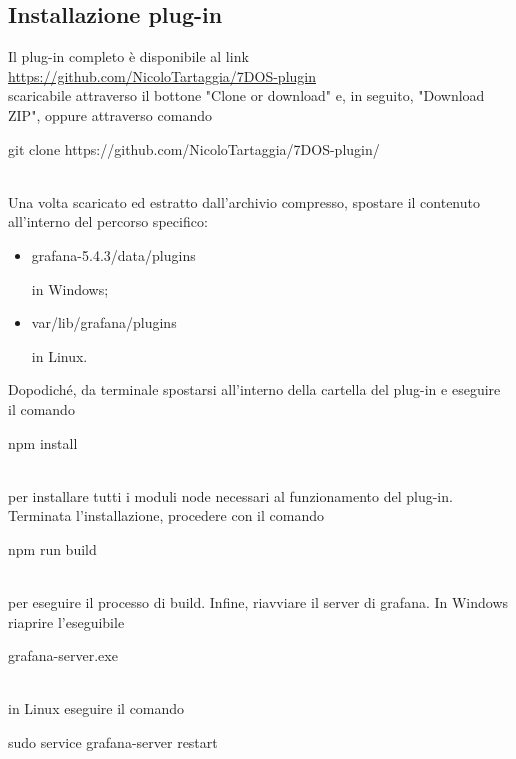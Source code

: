 \subsection{Installazione plug-in}
Il plug-in completo è disponibile al link \\[0.2cm]
\hspace*{10mm}\url{https://github.com/NicoloTartaggia/7DOS-plugin}\\[0.2cm]scaricabile attraverso il bottone "Clone or download" e, in seguito, "Download ZIP", oppure attraverso comando \\[0.2cm]
\hspace*{10mm}\begin{ttfamily}git clone https://github.com/NicoloTartaggia/7DOS-plugin/\end{ttfamily}\\[0.2cm]Una volta scaricato ed estratto dall'archivio compresso, spostare il contenuto all'interno del percorso specifico: 
\begin{itemize}
	\item{\begin{ttfamily}grafana-5.4.3/data/plugins\end{ttfamily}} in Windows; \item{\begin{ttfamily}var/lib/grafana/plugins\end{ttfamily} in Linux.}
\end{itemize}
Dopodiché, da terminale spostarsi all'interno della cartella del plug-in e eseguire il comando \\[0.2cm]
\hspace*{10mm}\begin{ttfamily}npm install\end{ttfamily}\\[0.2cm] per installare tutti i moduli node necessari al funzionamento del plug-in. Terminata l'installazione, procedere con il comando \\[0.2cm]
\hspace*{10mm}\begin{ttfamily}npm run build\end{ttfamily}\\[0.2cm] per eseguire il processo di build. 
Infine, riavviare il server di grafana. In Windows riaprire l'eseguibile \\[0.2cm]
\hspace*{10mm}\begin{ttfamily}grafana-server.exe\end{ttfamily}\\[0.2cm] in Linux eseguire il comando \\[0.2cm]
\hspace*{10mm}\begin{ttfamily}sudo service grafana-server restart\end{ttfamily}

